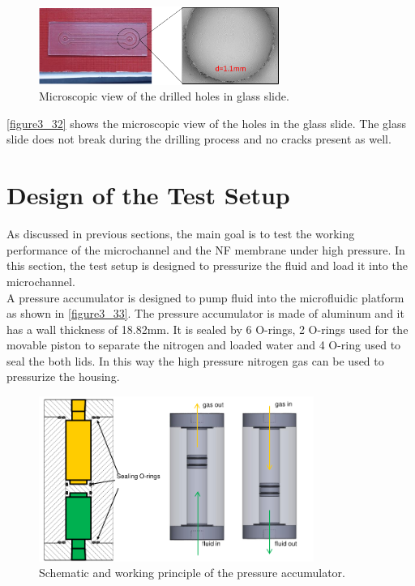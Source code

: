 \begin{figure}[!t]%
\centering
\includegraphics[width=0.7\textwidth]{figures/designandfabrication/figure3_32}%
\caption{Microscopic view of the drilled holes in glass slide.}%
\label{figure3_32}%
\end{figure}
\autoref{figure3_32} shows the microscopic view of the holes in the glass slide. The glass slide does not break during the drilling process and no cracks present as well.

\clearpage

\section{Design of the Test Setup}
\label{3_6}
As discussed in previous sections, the main goal is to test the working performance of the microchannel and the NF membrane under high pressure. In this section, the test setup is designed to pressurize the fluid and load it into the microchannel.\\

A pressure accumulator is designed to pump fluid into the microfluidic platform as shown in \autoref{figure3_33}. The pressure accumulator is made of aluminum and it has a wall thickness of 18.82mm. It is sealed by 6 O-rings, 2 O-rings used for the movable piston to separate the nitrogen and loaded water and 4 O-ring used to seal the both lids. In this way the high pressure nitrogen gas can be used to pressurize the housing. 

\begin{figure}[ht]%
\centering
\includegraphics[width=0.8\textwidth]{figures/designandfabrication/figure3_33}%
\caption{Schematic and working principle of the pressure accumulator.}%
\label{figure3_33}%
\end{figure}

